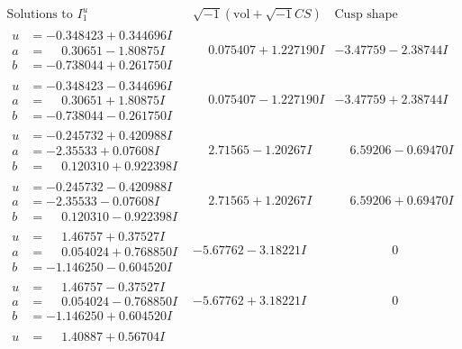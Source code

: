 \documentclass[1p]{elsarticle_modified}
\theoremstyle{definition}
\newcommand{\I}{\sqrt{-1}}
\begin{document}
$$\begin{array}{c|c|c}
\text{Solutions to }I^u_{1}& \I (\text{vol} + \sqrt{-1}CS) & \text{Cusp shape}\\
 \hline 
\begin{aligned}
u &= -0.348423 + 0.344696 I \\
a &= \phantom{-}0.30651 - 1.80875 I \\
b &= -0.738044 + 0.261750 I\end{aligned}
 & \phantom{-}0.075407 + 1.227190 I & -3.47759 - 2.38744 I \\ \hline\begin{aligned}
u &= -0.348423 - 0.344696 I \\
a &= \phantom{-}0.30651 + 1.80875 I \\
b &= -0.738044 - 0.261750 I\end{aligned}
 & \phantom{-}0.075407 - 1.227190 I & -3.47759 + 2.38744 I \\ \hline\begin{aligned}
u &= -0.245732 + 0.420988 I \\
a &= -2.35533 + 0.07608 I \\
b &= \phantom{-}0.120310 + 0.922398 I\end{aligned}
 & \phantom{-}2.71565 - 1.20267 I & \phantom{-}6.59206 - 0.69470 I \\ \hline\begin{aligned}
u &= -0.245732 - 0.420988 I \\
a &= -2.35533 - 0.07608 I \\
b &= \phantom{-}0.120310 - 0.922398 I\end{aligned}
 & \phantom{-}2.71565 + 1.20267 I & \phantom{-}6.59206 + 0.69470 I \\ \hline\begin{aligned}
u &= \phantom{-}1.46757 + 0.37527 I \\
a &= \phantom{-}0.054024 + 0.768850 I \\
b &= -1.146250 - 0.604520 I\end{aligned}
 & -5.67762 - 3.18221 I & \phantom{-0.000000 } 0 \\ \hline\begin{aligned}
u &= \phantom{-}1.46757 - 0.37527 I \\
a &= \phantom{-}0.054024 - 0.768850 I \\
b &= -1.146250 + 0.604520 I\end{aligned}
 & -5.67762 + 3.18221 I & \phantom{-0.000000 } 0 \\ \hline\begin{aligned}
u &= \phantom{-}1.40887 + 0.56704 I \\

\end{aligned}
\end{array}$$
\end{document}
